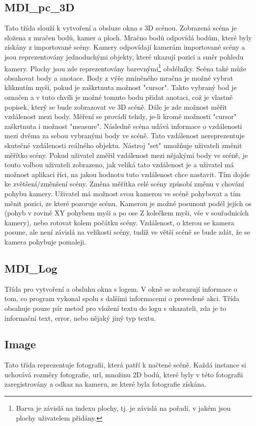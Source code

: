 \documentclass[11pt,twoside,a4paper]{book}
\begin{document}
\subsection{MDI\_pc\_3D}
Tato třída slouží k vytvoření a obsluze okna s 3D scénou. Zobrazená scéna je složena z mračen bodů, kamer a ploch. Mračno bodů odpovídá bodům, které byly získány z importované scény. Kamery odpovídají kamerám importované scény a jsou reprezentovány jednoduchými objekty, které ukazují pozici a směr pohledu kamery. Plochy jsou zde reprezentovány barevnými\footnote{Barva je závislá na indexu plochy, tj. je závislá na pořadí, v jakém jsou plochy uživatelem přidány.} obdélníky. Scéna také může obsahovat body a anotace. Body z výše zmíněného mračna je možné vybrat kliknutím myši, pokud je zaškrtnuta možnost "cursor". Takto vybraný bod je označen a v tuto chvíli je možné tomuto bodu přidat anotaci, což je vlastně popisek, který se bude zobrazovat ve 3D scéně. Dále je zde možnost měřit vzdálenost mezi body. Měření se provádí tehdy, je-li kromě možnosti "cursor" zaškrtnuta i možnost "measure". Následně scéna udává informace o vzdálenosti mezi dvěma za sebou vybranými body ve scéně. Tato vzdálenost nereprezentuje skutečné vzdálenosti reálného objektu. Nástroj "set" umožňuje uživateli změnit měřítko scény. Pokud uživatel změřil vzdálenost mezi nějakými body ve scéně, je touto volbou uživateli zobrazeno, jak veliká tato vzdálenost je a uživatel má možnost aplikaci říci, na jakou hodnotu tuto vzdálenost chce nastavit. Tím dojde ke zvětšení/změnšení scény. Změna měřítka celé scény způsobí změnu v chování pohybu kamery. Uživatel má možnost svou kamerou ve scéně pohybovat a tím měnit pozici, ze které pozoruje scénu. Kamerou je možné posunout podél jejích os (pohyb v rovině XY pohybem myši a po ose Z kolečkem myši, vše v souřadnicích kamery), nebo rotovat kolem počátku scény. Vzdálenost, o kterou se kamera posune, ale není závislá na velikosti scény, tudíž ve větší scéně se bude zdát, že se kamera pohybuje pomaleji. 

\subsection{MDI\_Log}
Třída pro vytvoření a obsluhu okna s logem. V okně se zobrazují informace o tom, co program vykonal spolu s dalšími informacemi o provedené akci. Třída obsahuje pouze pár metod pro vložení textu do logu s ukazateli, zda je to informační text, error, nebo nějaký jiný typ textu.

\subsection{Image}
Tato třída reprezentuje fotografii, která patří k načtené scéně. Každá instance si uchovává rozměry fotografie, url, množinu 2D bodů, které byly v této fotografii zaregistrovány a odkaz na kameru, ze které byla fotografie získána.
\end{document}
